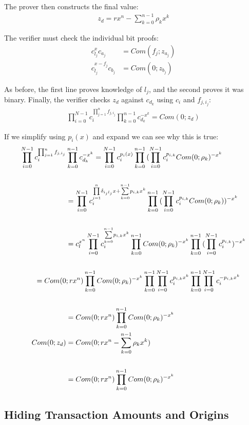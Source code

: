 \documentclass{article}
\newcommand\underoverset[3]{\underset{#1}{\overset{#2}{#3}}}
\begin{document}
The prover then constructs the final value:
\begin{align}
  z_d = r x^n - \sum_{k=0}^{n-1}{\rho_k x^k}
\end{align}

The verifier must check the individual bit proofs:
\begin{align}
  c_{l_j}^x c_{a_j} &= Com(f_j; z_{a_j})\\
  c_{l_j}^{x-f_j} c_{b_j} &= Com(0; z_{b_j})
\end{align}
    
As before, the first line proves knowledge of $l_j$, and the second proves it was binary.  Finally, the verifier checks $z_d$ against $c_{d_k}$ using $c_i$ and $f_{j,i_j}$:
\begin{align}
  \prod_{i=0}^{N-1}{c_i^{\prod_{j=1}^{n}{f_{j,i_j}}}} \prod_{k=0}^{n-1}{c_{d_k}^{-x^k}} = Com(0; z_d)
\end{align}

If we simplify using $p_i(x)$ and expand we can see why this is true:
\begin{align}
  \prod_{i=0}^{N-1}{c_i^{\prod_{j=1}^{n}{f_{j,i_j}}}} &  \prod_{k=0}^{n-1}{c_{d_k}^{-x^k}} = \prod_{i=0}^{N-1}{c_i^{p_i(x)}} \prod_{k=0}^{n-1}{(\prod_{i=0}^{N-1}{c_i^{p_{i,k}}} Com(0; \rho_k)^{-x^k}}\\
  \cr &= \prod_{i=0}^{N-1}{c_i^{  \underoverset{j=1}{n}{\prod}{\delta_{i_jl_j} x} + \underoverset{k=0}{n-1}{\sum}{p_{i,k} x^k}   }} \prod_{k=0}^{n-1}{(\prod_{i=0}^{N-1}{c_i^{p_{i,k}}} Com(0; \rho_k))^{-x^k}}\\
  \cr &= c_l^{x^n} \prod_{i=0}^{N-1}{c_i^{ \underoverset{k=0}{n-1}{\sum}{p_{i,k} x^k} }}        \prod_{k=0}^{n-1}{ Com(0; \rho_k)^{-x^k}}         \prod_{k=0}^{n-1}{(\prod_{i=0}^{N-1}{c_i^{p_{i,k}}})^{-x^k}}\\
  \cr = Com(0 &; r x^n) \prod_{k=0}^{n-1}{ Com(0; \rho_k)^{-x^k}}      \prod_{k=0}^{n-1}{\prod_{i=0}^{N-1}{c_i^{p_{i,k}  x^k}}}          \prod_{k=0}^{n-1}{\prod_{i=0}^{N-1}{c_i^{-p_{i,k} x^k}}}\\
  \cr &= Com(0; r x^n) \prod_{k=0}^{n-1}{ Com(0; \rho_k)^{-x^k}}\\
  Com(0; z_d) &= Com(0; rx^n - \sum_{k=0}^{n-1}{\rho_k x^k})\\
  \cr &= Com(0; rx^n) \prod_{k=0}^{n-1}{Com(0; \rho_k)^{-x^k}}
\end{align}


\subsection{Hiding Transaction Amounts and Origins}
 
\end{document}
